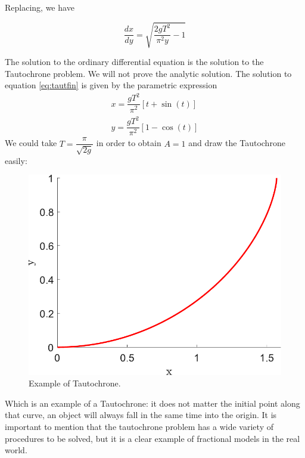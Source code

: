     Replacing, we have 
    
    \begin{equation}
        \dfrac{dx}{dy }=\sqrt{\dfrac{2gT^2}{\pi^2y}-1}
    \end{equation}\label{eq:tautfin}
    
    The solution to the ordinary differential equation is the solution to the Tautochrone problem. We will not prove the analytic solution. The solution to equation \ref{eq:tautfin} is given by the parametric expression
    \begin{align}
        x = \dfrac{gT^2}{\pi^2}[t+\sin(t)]\\
        y = \dfrac{gT^2}{\pi^2}[1-\cos(t)]
    \end{align}
    We could take $T=\dfrac{\pi}{\sqrt{2g}}$ in order to obtain $A=1$ and draw the Tautochrone easily:
    
    \begin{figure}[H]
        \centering
        \includegraphics[scale=0.5]{files/tautochrone.pdf}
        \caption{Example of Tautochrone.}
    \end{figure}
    
    Which is an example of a Tautochrone: it does not matter the initial point along that curve, an object will always fall in the same time into the origin. It is important to mention that the tautochrone problem has a wide variety of procedures to be solved, but it is a clear example of fractional models in the real world.
